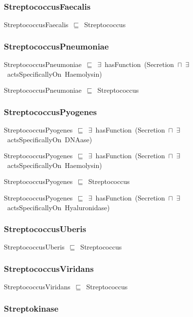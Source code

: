 \documentclass{article}
\begin{document}
\subsubsection*{StreptococcusFaecalis}

StreptococcusFaecalis~\ensuremath{\sqsubseteq}~Streptococcus~

\subsubsection*{StreptococcusPneumoniae}

StreptococcusPneumoniae~\ensuremath{\sqsubseteq}~\ensuremath{\exists}~hasFunction~(Secretion~\ensuremath{\sqcap}~\ensuremath{\exists}~actsSpecificallyOn~Haemolysin)~

StreptococcusPneumoniae~\ensuremath{\sqsubseteq}~Streptococcus~

\subsubsection*{StreptococcusPyogenes}

StreptococcusPyogenes~\ensuremath{\sqsubseteq}~\ensuremath{\exists}~hasFunction~(Secretion~\ensuremath{\sqcap}~\ensuremath{\exists}~actsSpecificallyOn~DNAase)~

StreptococcusPyogenes~\ensuremath{\sqsubseteq}~\ensuremath{\exists}~hasFunction~(Secretion~\ensuremath{\sqcap}~\ensuremath{\exists}~actsSpecificallyOn~Haemolysin)~

StreptococcusPyogenes~\ensuremath{\sqsubseteq}~Streptococcus~

StreptococcusPyogenes~\ensuremath{\sqsubseteq}~\ensuremath{\exists}~hasFunction~(Secretion~\ensuremath{\sqcap}~\ensuremath{\exists}~actsSpecificallyOn~Hyaluronidase)~

\subsubsection*{StreptococcusUberis}

StreptococcusUberis~\ensuremath{\sqsubseteq}~Streptococcus~

\subsubsection*{StreptococcusViridans}

StreptococcusViridans~\ensuremath{\sqsubseteq}~Streptococcus~

\subsubsection*{Streptokinase}
\end{document}
